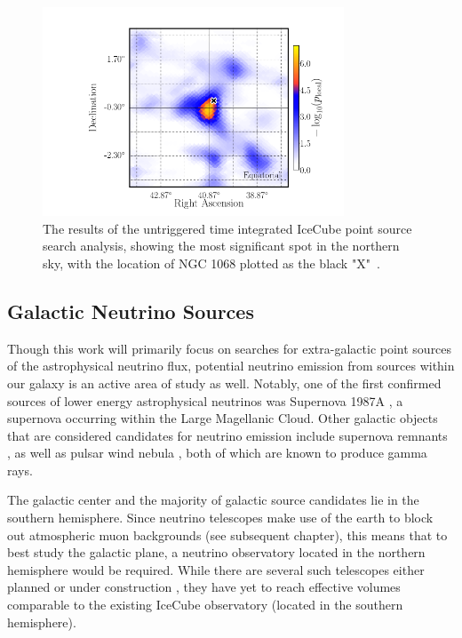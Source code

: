 \begin{figure}[h]
\centering
\includegraphics[width=0.8\textwidth]{figs/NGC_tint.png}
\caption{The results of the untriggered time integrated IceCube point source search analysis, showing the most significant spot in the northern sky, with the location of NGC 1068 plotted as the black "X"~\cite{10yr_tint}. }
\label{fig:NGC_tint}
\end{figure}


\subsection{Galactic Neutrino Sources}
Though this work will primarily focus on searches for extra-galactic point sources of the astrophysical neutrino flux, potential neutrino emission from sources within our galaxy is an active area of study as well. Notably, one of the first confirmed sources of lower energy astrophysical neutrinos was Supernova 1987A \cite{Bionta:1987qt}, a supernova occurring within the Large Magellanic Cloud. Other galactic objects that are considered candidates for neutrino emission include supernova remnants \cite{snr_2020}, as well as pulsar wind nebula \cite{pwn_2020}, both of which are known to produce gamma rays. 

The galactic center and the majority of galactic source candidates lie in the southern hemisphere. Since neutrino telescopes make use of the earth to block out atmospheric muon backgrounds (see subsequent chapter), this means that to best study the galactic plane, a neutrino observatory located in the northern hemisphere would be required. While there are several such telescopes either planned or under construction \cite{Agostini_2020}\cite{kappes2007km3net}, they have yet to reach effective volumes comparable to the existing IceCube observatory (located in the southern hemisphere). 

